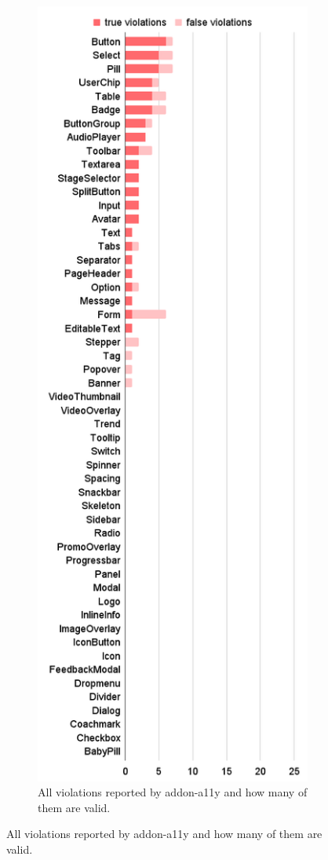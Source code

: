 \documentclass{master_thesis}
\begin{document}
\begin{figure}[ht]
	\begin{subfigure}{0.45\textwidth}
	\includegraphics[height=0.9\textheight]{img/audit-failed.png}
	\caption{All violations reported by addon-a11y and how many of them are valid.}

\end{subfigure}
\end{figure}
\end{document}
